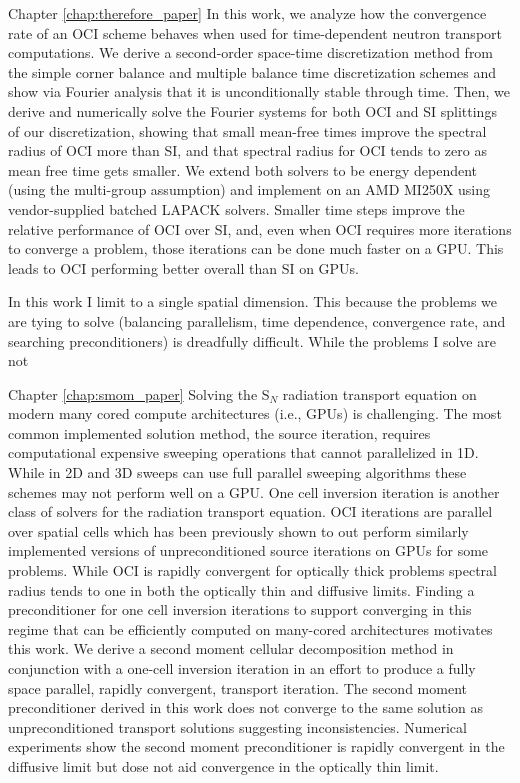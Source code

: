 Chapter \ref{chap:therefore_paper}
In this work, we analyze how the convergence rate of an OCI scheme behaves when used for time-dependent neutron transport computations.
We derive a second-order space-time discretization method from the simple corner balance and multiple balance time discretization schemes and show via Fourier analysis that it is unconditionally stable through time.
Then, we derive and numerically solve the Fourier systems for both OCI and SI splittings of our discretization, showing that small mean-free times improve the spectral radius of OCI more than SI, and that spectral radius for OCI tends to zero as mean free time gets smaller.
We extend both solvers to be energy dependent (using the multi-group assumption) and implement on an AMD MI250X using vendor-supplied batched LAPACK solvers.
Smaller time steps improve the relative performance of OCI over SI, and, even when OCI requires more iterations to converge a problem, those iterations can be done much faster on a GPU.
This leads to OCI performing better overall than SI on GPUs.

In this work I limit to a single spatial dimension.
This because the problems we are tying to solve (balancing parallelism, time dependence, convergence rate, and searching preconditioners) is dreadfully difficult.
While the problems I solve are not


Chapter \ref{chap:smom_paper}
Solving the S$_N$ radiation transport equation on modern many cored compute architectures (i.e., GPUs) is challenging.
The most common implemented solution method, the source iteration, requires computational expensive sweeping operations that cannot parallelized in 1D.
While in 2D and 3D sweeps can use full parallel sweeping algorithms these schemes may not perform well on a GPU.
One cell inversion iteration is another class of solvers for the radiation transport equation.
OCI iterations are parallel over spatial cells which has been previously shown to out perform similarly implemented versions of unpreconditioned source iterations on GPUs for some problems.
While OCI is rapidly convergent for optically thick problems spectral radius tends to one in both the optically thin and diffusive limits.
Finding a preconditioner for one cell inversion iterations to support converging in this regime that can be efficiently computed on many-cored architectures motivates this work.
We derive a second moment cellular decomposition method in conjunction with a one-cell inversion iteration in an effort to produce a fully space parallel, rapidly convergent, transport iteration.
The second moment preconditioner derived in this work does not converge to the same solution as unpreconditioned transport solutions suggesting inconsistencies.
Numerical experiments show the second moment preconditioner is rapidly convergent in the diffusive limit but dose not aid convergence in the optically thin limit.


